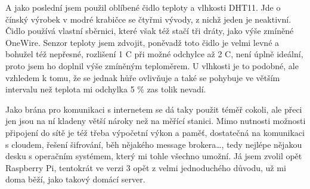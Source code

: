 A jako poslední jsem použil oblíbené čidlo teploty a vlhkosti DHT11. Jde o čínský výrobek v modré krabičce se čtyřmi 
vývody, z nichž jeden je neaktivní. Čidlo používá vlastní sběrnici, které však též stačí tři dráty, jako výše zmíněné 
OneWire. Senzor teploty jsem zdvojit, poněvadž toto čidlo je velmi levné a bohužel též nepřesné, rozlišení 1 \textdegree C při 
možné odchylce až 2 \textdegree C, není úplně ideální, proto jsem ho doplnil výše zmíněným teploměrem. U vlhkosti je to podobné, 
ale vzhledem k tomu, že se jednak hůře ovlivňuje a také se pohybuje ve větším intervalu než teplota mi odchylka 5 \% zas 
tolik nevadí.

Jako brána pro komunikaci s internetem se dá taky použit téměř cokoli, ale přeci jen jsou na ní kladeny větší nároky než 
na měřící stanici. Mimo nutnosti možnosti připojení do sítě je též třeba výpočetní výkon a paměť, dostatečná na 
komunikaci s cloudem, řešení šifrování, běh nějakého message brokera\ldots, tedy nejlépe nějakou desku s operačním 
systémem, který mi tohle všechno umožní. Já jsem zvolil opět Raspberry Pi, tentokrát ve verzi 3 opět z velmi 
jednoduchého důvodu, už mi doma běží, jako takový domácí server.
